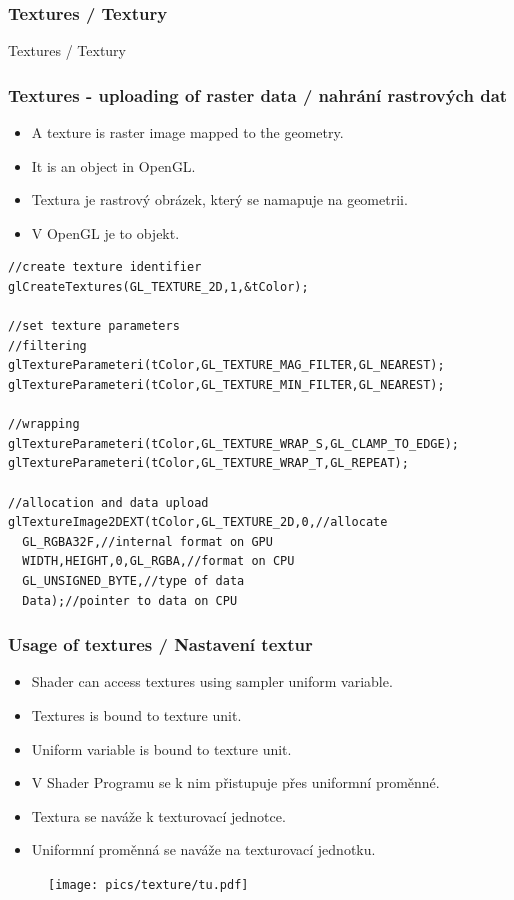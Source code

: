 \begin{frame}
\frametitle{Textures / Textury}
\begin{center}
\Huge {\color{white}Textures / Textury}
\end{center}
\end{frame}

\begin{frame}[fragile]\frametitle{Textures - uploading of raster data / nahrání rastrových dat}\scriptsize
\begin{itemize}
	\item A texture is raster image mapped to the geometry.
	\item It is an object in OpenGL.
\end{itemize}

\begin{itemize}
	\item Textura je rastrový obrázek, který se namapuje na geometrii.
	\item V OpenGL je to objekt.
\end{itemize}
{\scriptsize
\begin{verbatim}
//create texture identifier
glCreateTextures(GL_TEXTURE_2D,1,&tColor);

//set texture parameters
//filtering
glTextureParameteri(tColor,GL_TEXTURE_MAG_FILTER,GL_NEAREST);
glTextureParameteri(tColor,GL_TEXTURE_MIN_FILTER,GL_NEAREST);

//wrapping
glTextureParameteri(tColor,GL_TEXTURE_WRAP_S,GL_CLAMP_TO_EDGE);
glTextureParameteri(tColor,GL_TEXTURE_WRAP_T,GL_REPEAT);

//allocation and data upload
glTextureImage2DEXT(tColor,GL_TEXTURE_2D,0,//allocate
  GL_RGBA32F,//internal format on GPU
  WIDTH,HEIGHT,0,GL_RGBA,//format on CPU
  GL_UNSIGNED_BYTE,//type of data
  Data);//pointer to data on CPU
\end{verbatim}
}
\end{frame}

\begin{frame}[fragile]\frametitle{Usage of textures / Nastavení textur}\scriptsize
	\begin{itemize}
	\item Shader can access textures using sampler uniform variable.
	\item Textures is bound to texture unit.
	\item Uniform variable is bound to texture unit.
	\end{itemize}

	\begin{itemize}
	\item V Shader Programu se k nim přistupuje přes uniformní proměnné.
	\item Textura se naváže k texturovací jednotce.
	\item Uniformní proměnná se naváže na texturovací jednotku.
	\end{itemize}
	\begin{figure}[h]
		\texttt{[image: pics/texture/tu.pdf]}
	\end{figure}
\end{frame}

